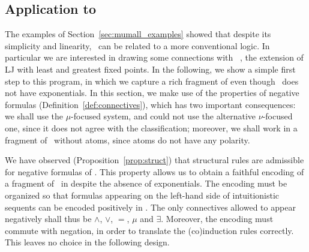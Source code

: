 \subsection{Application to \muLJL} \label{sec:foc_mulj}

The examples of Section~\ref{sec:mumall_examples} showed that despite
its simplicity and linearity, \mumall\ can be related to a more
conventional logic.
In particular we are interested in drawing some connections with
\muLJ~\cite{baelde08phd},
the extension of LJ with least and greatest fixed points.
In the following, we show a simple first step to this program,
in which we capture a rich fragment of \muLJ{}
even though \mumall\ does not have exponentials.
In this section, we make use of the properties of negative formulas
(Definition~\ref{def:connectives}), which has two important consequences:
we shall use the $\mu$-focused system, and could not use the
alternative $\nu$-focused one, since it does not agree with the 
classification;
moreover, we shall work in a fragment of \mumall\ without atoms,
since atoms do not have any polarity.

We have observed (Proposition~\ref{prop:struct}) that structural rules are 
admissible for negative formulas of \mumall.
This property allows us to obtain a 
faithful encoding of a fragment of \muLJ\ in \mumall{}
despite the absence of exponentials.
The encoding must be organized so that formulas appearing on
the left-hand side of intuitionistic sequents can be encoded positively
in \mumall.
The only connectives allowed to appear negatively shall thus be
$\wedge$, $\vee$, $=$, $\mu{}$ and $\exists$.
Moreover, the encoding must commute with negation,
in order to translate the (co)induction rules correctly.
This leaves no choice in the following design.

